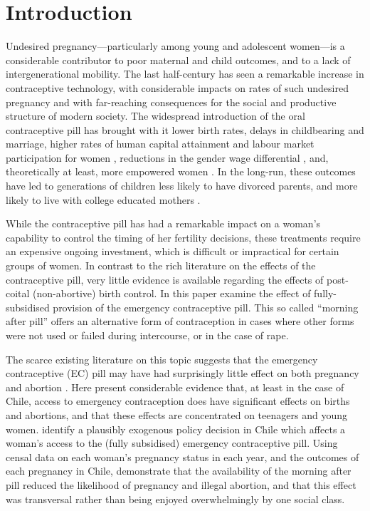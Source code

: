 \section{Introduction}
Undesired pregnancy---particularly among young and adolescent women---is a
considerable contributor to poor maternal and child outcomes, and to a lack of
intergenerational mobility.  The last half-century has seen a remarkable 
increase in contraceptive technology, with considerable impacts on rates of such
undesired pregnancy and with far-reaching consequences for the social and 
productive structure of modern society. The widespread introduction of the oral 
contraceptive pill has brought with it lower birth rates, delays in childbearing 
and marriage, higher rates of human capital attainment and labour market 
participation for women \citep{AngristEvans1996,Bailey2006,GoldinKatz2002a,
GoldinKatz2002b}, reductions in the gender wage differential 
\citep{Baileyetal2012}, and, theoretically at least, more empowered women 
\citep{ChiapporiOreffice2008}.  In the long-run, these outcomes have led to 
generations of children less likely to have divorced parents, and more likely to 
live with college educated mothers \citep{OltmansHungerman2012}.

While the contraceptive pill has had a remarkable impact on a woman's capability
to control the timing of her fertility decisions, these treatments require an
expensive ongoing investment, which is difficult or impractical for certain groups
of women.  In contrast to the rich literature on the effects of the contraceptive 
pill, very little evidence is available regarding the effects of post-coital 
(non-abortive) birth control.  In this paper \person examine the effect of
fully-subsidised provision of the emergency contraceptive pill.  This so called 
``morning after pill'' offers an alternative form of contraception in cases where 
other forms were not used or failed during intercourse, or in the case of rape.

The scarce existing literature on this topic suggests that the emergency 
contraceptive (EC) pill may have had surprisingly little effect on both pregnancy
and abortion \citep{Grossetal2012,Durrance2013}.  Here \person present
considerable evidence that, at least in the case of Chile, access to emergency 
contraception does have significant effects on births and abortions, and that
these effects are concentrated on teenagers and young women.  \Person identify 
a plausibly exogenous policy decision in Chile which affects a woman's access to 
the (fully subsidised) emergency contraceptive pill.  Using censal data on each 
woman's pregnancy status in each year, and the outcomes of each pregnancy in Chile, 
\person demonstrate that the availability of the morning after pill reduced the 
likelihood of pregnancy and illegal abortion, and that this effect was transversal 
rather than being enjoyed overwhelmingly by one social class. 

